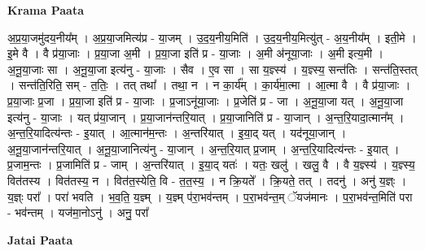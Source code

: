\documentclass[17pt]{extarticle}
\begin{document}
\textbf{Krama Paata} \newline

अ॒प्र॒या॒जमु॑दय॒नीय᳚म् । अ॒प्र॒या॒जमित्य॑प्र - या॒जम् । उ॒द॒य॒नीय॒मिति॑ । उ॒द॒य॒नीय॒मित्यु॑त् - अ॒य॒नीय᳚म् । इती॒मे । इ॒मे वै । वै प्र॑या॒जाः । प्र॒या॒जा अ॒मी । प्र॒या॒जा इति॑ प्र - या॒जाः । अ॒मी अ॑नूया॒जाः । अ॒मी इत्य॒मी । अ॒नू॒या॒जाः सा । अ॒नू॒या॒जा इत्य॑नु - या॒जाः । सैव । ए॒व सा । सा य॒ज्ञ्स्य॑ । य॒ज्ञ्स्य॒ सन्त॑तिः । सन्त॑ति॒स्तत् । सन्त॑ति॒रिति॒ सम् - त॒तिः॒ । तत् तथा᳚ । तथा॒ न । न का॒र्य᳚म् । का॒र्य॑मा॒त्मा । आ॒त्मा वै । वै प्र॑या॒जाः । प्र॒या॒जाः प्र॒जा । प्र॒या॒जा इति॑ प्र - या॒जाः । प्र॒जाऽनू॑या॒जाः । प्र॒जेति॑ प्र - जा । अ॒नू॒या॒जा यत् । अ॒नू॒या॒जा इत्य॑नु - या॒जाः । यत् प्र॑या॒जान् । प्र॒या॒जान॑न्तरि॒यात् । प्र॒या॒जानिति॑ प्र - या॒जान् । अ॒न्त॒रि॒यादा॒त्मान᳚म् । अ॒न्त॒रि॒यादित्य॑न्तः - इ॒यात् । आ॒त्मान॑म॒न्तः । अ॒न्तरि॑यात् । इ॒या॒द् यत् । यद॑नूया॒जान् । अ॒नू॒या॒जान॑न्तरि॒यात् । अ॒नू॒या॒जानित्य॑नु - या॒जान् । अ॒न्त॒रि॒यात् प्र॒जाम् । अ॒न्त॒रि॒यादित्य॑न्तः - इ॒यात् । प्र॒जाम॒न्तः । प्र॒जामिति॑ प्र - जाम् । अ॒न्तरि॑यात् । इ॒या॒द् यतः॑ । यतः॒ खलु॑ । खलु॒ वै । वै य॒ज्ञ्स्य॑ । य॒ज्ञ्स्य॒ वित॑तस्य । वित॑तस्य॒ न । वित॑त॒स्येति॒ वि - त॒त॒स्य॒ । न क्रि॒यते᳚ । क्रि॒यते॒ तत् । तदनु॑ । अनु॑ य॒ज्ञ्ः । य॒ज्ञ्ः परा᳚ । परा॑ भवति । भ॒व॒ति॒ य॒ज्ञ्म् । य॒ज्ञ्म् प॑रा॒भव॑न्तम् । प॒रा॒भव॑न्त॒म् ॅयज॑मानः । प॒रा॒भव॑न्त॒मिति॑ परा - भव॑न्तम् । यज॑मा॒नोऽनु॑ । अनु॒ परा᳚ \newline

\textbf{Jatai Paata} \newline
\end{document}
